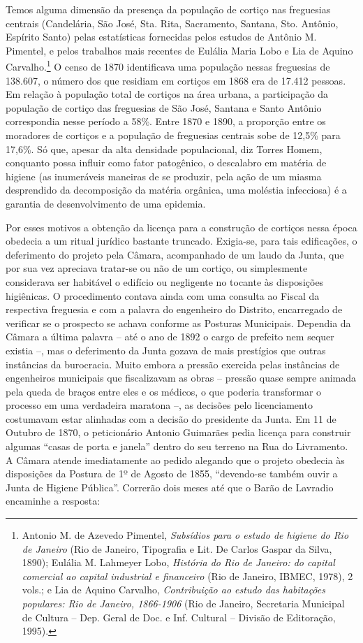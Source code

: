 Temos alguma dimensão da presença da população de cortiço nas freguesias
centrais (Candelária, São José, Sta. Rita, Sacramento, Santana, Sto.
Antônio, Espírito Santo) pelas estatísticas fornecidas pelos estudos de
Antônio M. Pimentel, e pelos trabalhos mais recentes de Eulália Maria
Lobo e Lia de Aquino Carvalho.\footnote{Antonio M. de Azevedo Pimentel,
  \emph{Subsídios para o estudo de higiene do Rio de Janeiro} (Rio de
  Janeiro, Tipografia e Lit. De Carlos Gaspar da Silva, 1890); Eulália
  M. Lahmeyer Lobo, \emph{História do Rio de Janeiro: do capital
  comercial ao capital industrial e financeiro} (Rio de Janeiro, IBMEC,
  1978), 2 vols.; e Lia de Aquino Carvalho, \emph{Contribuição ao estudo
  das habitações populares: Rio de Janeiro, 1866-1906} (Rio de Janeiro,
  Secretaria Municipal de Cultura -- Dep. Geral de Doc. e Inf. Cultural
  -- Divisão de Editoração, 1995).} O censo de 1870 identificava uma
população nessas freguesias de 138.607, o número dos que residiam em
cortiços em 1868 era de 17.412 pessoas. Em relação à população total de
cortiços na área urbana, a participação da população de cortiço das
freguesias de São José, Santana e Santo Antônio correspondia nesse
período a 58\%. Entre 1870 e 1890, a proporção entre os moradores de
cortiços e a população de freguesias centrais sobe de 12,5\% para
17,6\%. Só que, apesar da alta densidade populacional, diz Torres Homem,
conquanto possa influir como fator patogênico, o descalabro em matéria
de higiene (as inumeráveis maneiras de se produzir, pela ação de um
miasma desprendido da decomposição da matéria orgânica, uma moléstia
infecciosa) é a garantia de desenvolvimento de uma epidemia.

Por esses motivos a obtenção da licença para a construção de cortiços
nessa época obedecia a um ritual jurídico bastante truncado. Exigia-se,
para tais edificações, o deferimento do projeto pela Câmara, acompanhado
de um laudo da Junta, que por sua vez apreciava tratar-se ou não de um
cortiço, ou simplesmente considerava ser habitável o edifício ou
negligente no tocante às disposições higiênicas. O procedimento contava
ainda com uma consulta ao Fiscal da respectiva freguesia e com a palavra
do engenheiro do Distrito, encarregado de verificar se o prospecto se
achava conforme as Posturas Municipais. Dependia da Câmara a última
palavra -- até o ano de 1892 o cargo de prefeito nem sequer existia --,
mas o deferimento da Junta gozava de mais prestígios que outras
instâncias da burocracia. Muito embora a pressão exercida pelas
instâncias de engenheiros municipais que fiscalizavam as obras --
pressão quase sempre animada pela queda de braços entre eles e os
médicos, o que poderia transformar o processo em uma verdadeira maratona
--, as decisões pelo licenciamento costumavam estar alinhadas com a
decisão do presidente da Junta. Em 11 de Outubro de 1870, o peticionário
Antonio Guimarães pedia licença para construir algumas ``casas de porta
e janela'' dentro do seu terreno na Rua do Livramento. A Câmara atende
imediatamente ao pedido alegando que o projeto obedecia às disposições
da Postura de 1º de Agosto de 1855, ``devendo-se também ouvir a Junta de
Higiene Pública''. Correrão dois meses até que o Barão de Lavradio
encaminhe a resposta:

